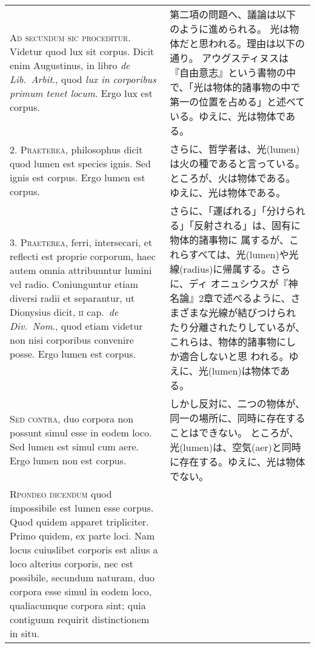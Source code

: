 \documentclass[10pt]{jsarticle} %
\begin{document}
\begin{longtable}{p{21em}p{21em}}



{\huge A}{\scshape d secundum sic proceditur}. Videtur quod lux sit
corpus. Dicit enim Augustinus, in libro {\itshape de Lib.~Arbit}., quod
{\itshape lux in corporibus primum tenet locum}. Ergo lux est corpus.

&


第二項の問題へ、議論は以下のように進められる。
光は物体だと思われる。理由は以下の通り。
アウグスティヌスは『自由意志』という書物の中で、「光は物体的諸事物の中で
 第一の位置を占める」と述べている。ゆえに、光は物体である。

\\


{\scshape 2. Praeterea}, philosophus dicit quod lumen est
species ignis. Sed ignis est corpus. Ergo lumen est corpus.

&

さらに、哲学者は、光(lumen)は火の種であると言っている。ところが、火は物体である。
 ゆえに、光は物体である。

\\


{\scshape 3. Praeterea}, ferri, intersecari, et reflecti
est proprie corporum, haec autem omnia attribuuntur lumini vel
radio. Coniunguntur etiam diversi radii et separantur, ut Dionysius
dicit, {\scshape ii} cap.~{\itshape de Div.~Nom}., quod etiam videtur non nisi corporibus
convenire posse. Ergo lumen est corpus.

&

さらに、「運ばれる」「分けられる」「反射される」は、固有に物体的諸事物に
 属するが、これらすべては、光(lumen)や光線(radius)に帰属する。さらに、ディ
 オニュシウスが『神名論』2章で述べるように、さまざまな光線が結びつけられ
 たり分離されたりしているが、これらは、物体的諸事物にしか適合しないと思
 われる。ゆえに、光(lumen)は物体である。


\\


{\scshape Sed contra}, duo corpora non possunt simul
esse in eodem loco. Sed lumen est simul cum aere. Ergo lumen non est
corpus.

&
しかし反対に、二つの物体が、同一の場所に、同時に存在することはできない。
 ところが、光(lumen)は、空気(aer)と同時に存在する。ゆえに、光は物体でない。

\\


{\scshape Rpondeo dicendum} quod impossibile est lumen
esse corpus. Quod quidem apparet tripliciter. Primo quidem, ex parte
loci. Nam locus cuiuslibet corporis est alius a loco alterius corporis,
nec est possibile, secundum naturam, duo corpora esse simul in eodem
loco, qualiacumque corpora sint; quia contiguum requirit distinctionem
in situ. 



\end{longtable}
\end{document}
